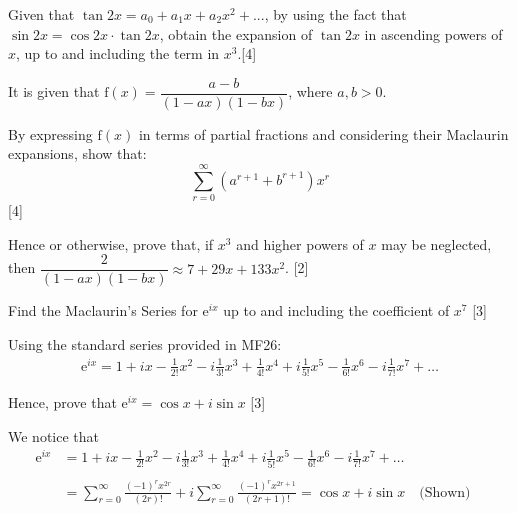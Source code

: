\documentclass[12pt, a4 paper]{article}
\begin{document}
\begin{outline}[enumerate]
 \1 Given that $\tan{2x}=a_{0}+a_{1}x+a_{2}x^2+...$, by using the fact that $\sin{2x}=\cos{2x}\cdot \tan{2x}$, obtain the expansion of $\tan{2x}$ in ascending powers of $x$, up to and including the term in $x^3$.\hfill[4] %

 \1 It is given that $\textrm{f}(x)=\dfrac{a-b}{(1-ax)(1-bx)}$, where $a,b>0$. %

 \2 By expressing $\textrm{f}(x)$ in terms of partial fractions and considering their Maclaurin expansions, show that:
 \begin{equation*}
   \sum_{r=0}^{\infty}(a^{r+1}+b^{r+1})x^{r}
 \end{equation*}\hfill[4]

 \2 Hence or otherwise, prove that, if $x^3$ and higher powers of $x$ may be neglected, then $\dfrac{2}{(1-ax)(1-bx)} \approx 7+29x+133x^2$.
 \hfill[2]

 \1 Find the Maclaurin's Series for $\mathrm{e}^{ix}$ up to and including the coefficient of $x^7$ \hfill[3]
 \begin{answer}
   Using the standard series provided in MF26:
   \begin{align*}
     \mathrm{e}^{ix} = 1 + ix - \frac{1}{2!}x^2 - i\frac{1}{3!}x^3 + \frac{1}{4!}x^4 + i\frac{1}{5!}x^5 - \frac{1}{6!}x^6 - i\frac{1}{7!}x^7+ \dots
   \end{align*}
 \end{answer}
 Hence, prove that $\mathrm{e}^{ix} = \cos x + i\sin x$ \hfill[3] %
 \begin{answer}
   We notice that
   \begin{align*}
     \mathrm{e}^{ix} &= 1 + ix - \frac{1}{2!}x^2 - i\frac{1}{3!}x^3 + \frac{1}{4!}x^4 + i\frac{1}{5!}x^5 - \frac{1}{6!}x^6 - i\frac{1}{7!}x^7+ \dots \\\\
     &= \sum_{r=0}^{\infty} \frac{(-1)^r x^{2r}}{(2r)!} + i\sum_{r=0}^{\infty} \frac{(-1)^r x^{2r+1}}{(2r+1)!} = \cos x + i\sin x \quad\textrm{(Shown)}\quad
   \end{align*}
 \end{answer}
\end{outline}
\end{document}

